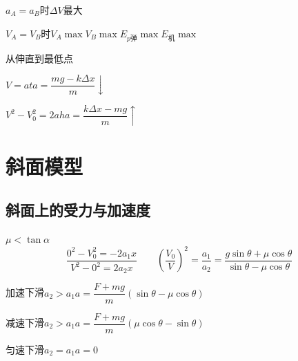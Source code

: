 $a_A=a_B$时\quad $\Delta V$最大

$V_A=V_B$时\quad $V_A\max$\quad $V_B\max$\quad $E_{p\text{弹}}\max$\quad $E_{\text{机}}\max$ %

\begin{problem}
从伸直到最低点
\begin{solution}
$V=at$\qquad $a=\dfrac{mg-k\Delta x}{m}\downarrow$

$V^2-V_0^2=2ah$\qquad $a=\dfrac{k\Delta x-mg}{m}\uparrow$
\end{solution}
\end{problem}


\section{斜面模型}
\subsection{斜面上的受力与加速度}
$\mu<\tan\alpha$
\[
\frac{0^2-V_0^2=-2a_1x}{V^2-0^2=2a_2x}\qquad
\left(\frac{V_0}{V}\right)^2=\frac{a_1}{a_2}=\frac{g\sin\theta+\mu\cos\theta}{\sin\theta-\mu\cos\theta}
\] %

\begin{problem}
\begin{solution}
加速下滑\quad $a_2>a_1$\quad $a=\dfrac{F+mg}{m}(\sin\theta-\mu\cos\theta)$ %

减速下滑\quad $a_2>a_1$\quad $a=\dfrac{F+mg}{m}(\mu\cos\theta-\sin\theta)$

匀速下滑\quad $a_2=a_1$\quad $a=0$
\end{solution}
\end{problem}

